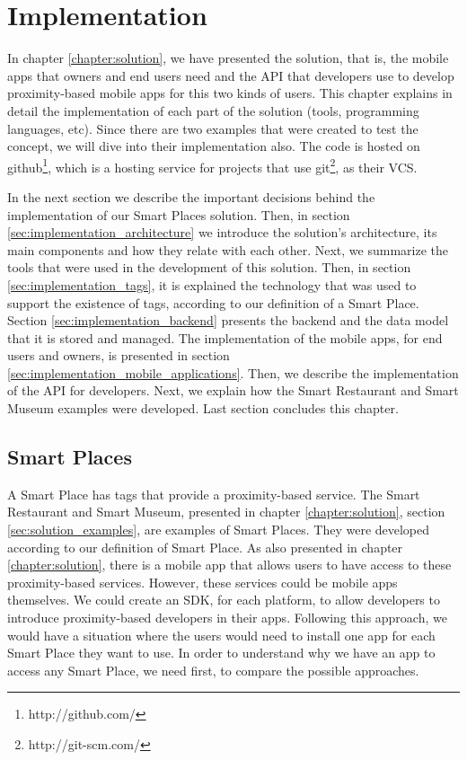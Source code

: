 
\chapter{Implementation}
\label{chapter:implementation}
In chapter \ref{chapter:solution}, we have presented the solution, that is,
the mobile apps that owners and end users need and the \gls{API} that developers use
to develop proximity-based mobile apps for this two kinds of users.
This chapter explains in detail the implementation of each part of the solution
(tools, programming languages, etc). Since there are two examples that were
created to test the concept, we will dive into their implementation also.
The code is hosted on
github\footnote{http://github.com/}, which is a hosting service for projects
that use git\footnote{http://git-scm.com/}, as their \gls{VCS}.

In the next section we describe the important decisions behind the implementation of our Smart Places solution.
Then, in section \ref{sec:implementation_architecture} we introduce the solution's architecture, its main components and how they relate with each other.
Next, we summarize the tools that were used in the development of this solution.
Then, in section \ref{sec:implementation_tags}, it is explained the technology that was used to support the existence of tags, according to our definition of a Smart Place.
Section \ref{sec:implementation_backend} presents the backend and the data model that it is stored and managed.
The implementation of the mobile apps, for end users and owners, is presented in section \ref{sec:implementation_mobile_applications}.
Then, we describe the implementation of the \gls{API} for developers.
Next, we explain how the Smart Restaurant and Smart Museum examples were developed.
Last section concludes this chapter.

\section{Smart Places}
\label{sec:implementation_smart_places}
A Smart Place has tags that provide a proximity-based service.
The Smart Restaurant and Smart Museum, presented in chapter \ref{chapter:solution}, section \ref{sec:solution_examples}, are examples of Smart Places.
They were developed according to our definition of Smart Place.
As also presented in chapter \ref{chapter:solution}, there is a mobile app that allows users to have access to these proximity-based services.
However, these services could be mobile apps themselves.
We could create an \gls{SDK}, for each platform, to allow developers to introduce proximity-based developers in their apps.
Following this approach, we would have a situation where the users would need to install one app for each Smart Place they want to use.
In order to understand why we have an app to access any Smart Place, we need first, to compare the possible approaches.

